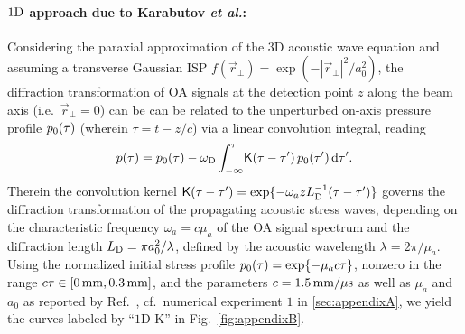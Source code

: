 \documentclass[12pt]{iopart}
\begin{document}
\paragraph{$1{\rm{D}}$ approach due to Karabutov {\emph{et al.}}:}
Considering the paraxial approximation of the $3$D acoustic wave equation and
assuming a transverse Gaussian ISP $f(\vec{r}_{\perp}) =
\exp(-|\vec{r}_{\perp}|^2/a_0^2)$, the diffraction transformation of OA signals
at the detection point $z$ along the beam axis (i.e.\ $\vec{r}_{\perp}=0$) can
be can be related to the unperturbed on-axis pressure profile $p_{\rm 0}(\tau)$
(wherein $\tau=t - z/c$)
via a linear convolution integral, \mbox{reading \cite{Karabutov:1996}}
\begin{equation}
p(\tau) = p_{\rm 0}(\tau) - \omega_{\rm D} \int_{-\infty}^{\tau}
        \!\mathsf{K}(\tau-\tau^\prime)\,p_{\rm 0}(\tau^\prime)
        \,\mathrm{d}\tau^\prime.
        \label{eq:OAV2}
\end{equation}
Therein the convolution kernel
\mbox{$\mathsf{K}(\tau-\tau^\prime)=\exp\{-\omega_{a} z L_{\rm
D}^{-1}(\tau-\tau^\prime)\}$} governs the diffraction transformation of the
propagating acoustic stress waves, depending on the characteristic frequency
$\omega_{a}=c \mu_a$ of the OA signal spectrum and the diffraction length
$L_{\rm D}=\pi a_0^2/\lambda$, defined by the acoustic wavelength 
$\lambda=2 \pi / \mu_a$.  Using the normalized initial stress
profile $p_{\rm 0}(\tau)=\exp\{-\mu_a c \tau\}$, nonzero in the range $c\tau
\in [0\,{\rm mm},0.3\,{\rm mm}]$, and the parameters $c=1.5\,{\rm mm/\mu s}$ as
well as $\mu_a$ and $a_0$ as reported by Ref.\ \cite{Paltauf:2000}, cf.\
numerical experiment $1$ in \ref{sec:appendixA}, we yield the curves labeled
by ``$1$D-K'' in \mbox{Fig.\ \ref{fig:appendixB}}.
\end{document}
